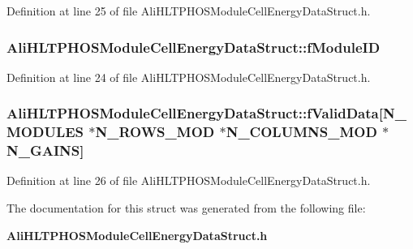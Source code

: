 Definition at line 25 of file Ali\-HLTPHOSModule\-Cell\-Energy\-Data\-Struct.h.
\subsubsection{ {\bf Ali\-HLTPHOSModule\-Cell\-Energy\-Data\-Struct::f\-Module\-ID}}\label{structAliHLTPHOSModuleCellEnergyDataStruct_o0}




Definition at line 24 of file Ali\-HLTPHOSModule\-Cell\-Energy\-Data\-Struct.h.
\subsubsection{ {\bf Ali\-HLTPHOSModule\-Cell\-Energy\-Data\-Struct::f\-Valid\-Data}[N\_\-MODULES $\ast$N\_\-ROWS\_\-MOD $\ast$N\_\-COLUMNS\_\-MOD $\ast$N\_\-GAINS]}\label{structAliHLTPHOSModuleCellEnergyDataStruct_o2}




Definition at line 26 of file Ali\-HLTPHOSModule\-Cell\-Energy\-Data\-Struct.h.

The documentation for this struct was generated from the following file:\begin{CompactItemize}
\item 
{\bf Ali\-HLTPHOSModule\-Cell\-Energy\-Data\-Struct.h}\end{CompactItemize}

